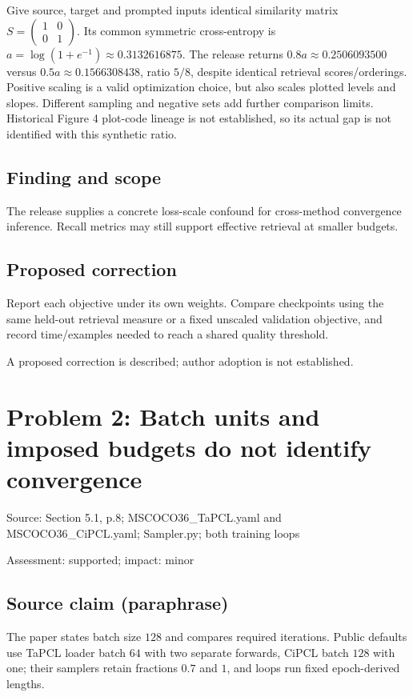 \documentclass[11pt]{article}
\begin{document}
Give source, target and prompted inputs identical similarity matrix \(S=\left(\begin{smallmatrix}1&0\\0&1\end{smallmatrix}\right)\). Its common symmetric cross-entropy is \(a=\log(1+e^{-1})\approx0.3132616875\). The release returns \(0.8a\approx0.2506093500\) versus \(0.5a\approx0.1566308438\), ratio \(5/8\), despite identical retrieval scores/orderings. Positive scaling is a valid optimization choice, but also scales plotted levels and slopes. Different sampling and negative sets add further comparison limits. Historical Figure 4 plot-code lineage is not established, so its actual gap is not identified with this synthetic ratio.

\subsection*{Finding and scope}

The release supplies a concrete loss-scale confound for cross-method convergence inference. Recall metrics may still support effective retrieval at smaller budgets.

\subsection*{Proposed correction}

Report each objective under its own weights. Compare checkpoints using the same held-out retrieval measure or a fixed unscaled validation objective, and record time/examples needed to reach a shared quality threshold.

A proposed correction is described; author adoption is not established.

\section*{Problem 2: Batch units and imposed budgets do not identify convergence}

Source: Section 5.1, p.8; MSCOCO36\_TaPCL.yaml and MSCOCO36\_CiPCL.yaml; Sampler.py; both training loops

Assessment: supported; impact: minor

\subsection*{Source claim (paraphrase)}

The paper states batch size \(128\) and compares required iterations. Public defaults use TaPCL loader batch \(64\) with two separate forwards, CiPCL batch \(128\) with one; their samplers retain fractions \(0.7\) and \(1\), and loops run fixed epoch-derived lengths.
\end{document}
